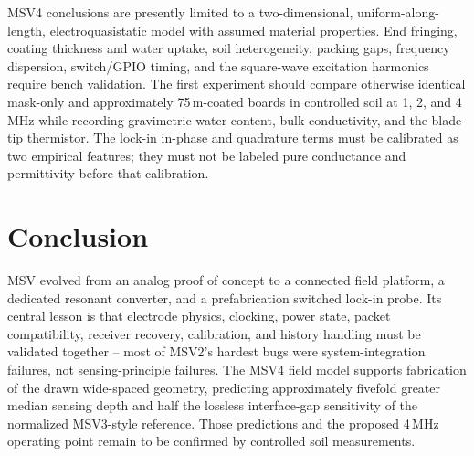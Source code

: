 \documentclass[conference]{IEEEtran}
\begin{document}
MSV4 conclusions are presently limited to a two-dimensional, uniform-along-length,
electroquasistatic model with assumed material properties. End fringing, coating thickness and
water uptake, soil heterogeneity, packing gaps, frequency dispersion, switch/GPIO timing, and the
square-wave excitation harmonics require bench validation. The first experiment should compare
otherwise identical mask-only and approximately 75\,\textmu m-coated boards in controlled soil at
1, 2, and 4\,MHz while recording gravimetric water content, bulk conductivity, and the blade-tip
thermistor. The lock-in in-phase and quadrature terms must be calibrated as two empirical features;
they must not be labeled pure conductance and permittivity before that calibration.

\section{Conclusion}
MSV evolved from an analog proof of concept to a connected field platform, a dedicated resonant
converter, and a prefabrication switched lock-in probe. Its central lesson is that electrode
physics, clocking, power state, packet compatibility, receiver recovery, calibration, and history
handling must be validated together -- most of MSV2's hardest bugs were system-integration
failures, not sensing-principle failures. The MSV4 field model supports fabrication of the drawn
wide-spaced geometry, predicting approximately fivefold greater median sensing depth and half the
lossless interface-gap sensitivity of the normalized MSV3-style reference. Those predictions and
the proposed 4\,MHz operating point remain to be confirmed by controlled soil measurements.
\end{document}
